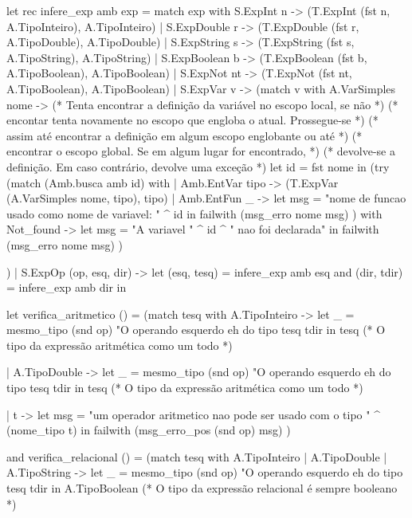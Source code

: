 \documentclass[12pt,a4paper,twoside]{report}
\begin{document}
\begin{terminal}
let rec infere_exp amb exp =
  match exp with
    S.ExpInt n    -> (T.ExpInt (fst n, A.TipoInteiro), A.TipoInteiro)
  | S.ExpDouble r -> (T.ExpDouble (fst r, A.TipoDouble), A.TipoDouble)
  | S.ExpString s -> (T.ExpString (fst s, A.TipoString), A.TipoString)
  | S.ExpBoolean b   -> (T.ExpBoolean (fst b, A.TipoBoolean), A.TipoBoolean)
  | S.ExpNot nt   -> (T.ExpNot (fst nt, A.TipoBoolean), A.TipoBoolean)
  | S.ExpVar v ->
    (match v with
       A.VarSimples nome ->
       (* Tenta encontrar a definição da variável no escopo local, se não      *)
       (* encontar tenta novamente no escopo que engloba o atual. Prossegue-se *)
       (* assim até encontrar a definição em algum escopo englobante ou até    *)
       (* encontrar o escopo global. Se em algum lugar for encontrado,         *)
       (* devolve-se a definição. Em caso contrário, devolve uma exceção       *)
       let id = fst nome in
         (try (match (Amb.busca amb id) with
               | Amb.EntVar tipo -> (T.ExpVar (A.VarSimples nome, tipo), tipo)
               | Amb.EntFun _ ->
                 let msg = "nome de funcao usado como nome de variavel: " ^ id in
                  failwith (msg_erro nome msg)
             )
          with Not_found ->
                 let msg = "A variavel " ^ id ^ " nao foi declarada" in
                 failwith (msg_erro nome msg)
         )

    )
  | S.ExpOp (op, esq, dir) ->
    let (esq, tesq) = infere_exp amb esq
    and (dir, tdir) = infere_exp amb dir in

    let verifica_aritmetico () =
      (match tesq with
         A.TipoInteiro ->
         let _ = mesmo_tipo (snd op)
                      "O operando esquerdo eh do tipo %
                      tesq tdir
         in tesq (* O tipo da expressão aritmética como um todo *)

       | A.TipoDouble ->
         let _ = mesmo_tipo (snd op)
                      "O operando esquerdo eh do tipo %
                      tesq tdir
         in tesq (* O tipo da expressão aritmética como um todo *)

       | t -> let msg = "um operador aritmetico nao pode ser usado com o tipo " ^
                        (nome_tipo t)
         in failwith (msg_erro_pos (snd op) msg)
      )

    and verifica_relacional () =
      (match tesq with
         A.TipoInteiro
       | A.TipoDouble
       | A.TipoString ->
         let _ = mesmo_tipo (snd op)
                   "O operando esquerdo eh do tipo %
                   tesq tdir
         in A.TipoBoolean (* O tipo da expressão relacional é sempre booleano *)


\end{terminal}
\end{document}
